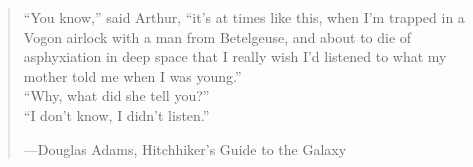 \phantom{.}
\vspace{4in}

\begin{singlespace}
\begin{quote}
  ``You know,'' said Arthur, ``it's at times like this, when I'm trapped in a Vogon airlock with a man from Betelgeuse, and about to die of asphyxiation in deep space that I really wish I'd listened to what my mother told me when I was young.''\\
  ``Why, what did she tell you?''\\
  ``I don't know, I didn't listen.''\\
  \begin{flushright}
    ---Douglas Adams, Hitchhiker's Guide to the Galaxy
  \end{flushright}
\end{quote}
\end{singlespace}
